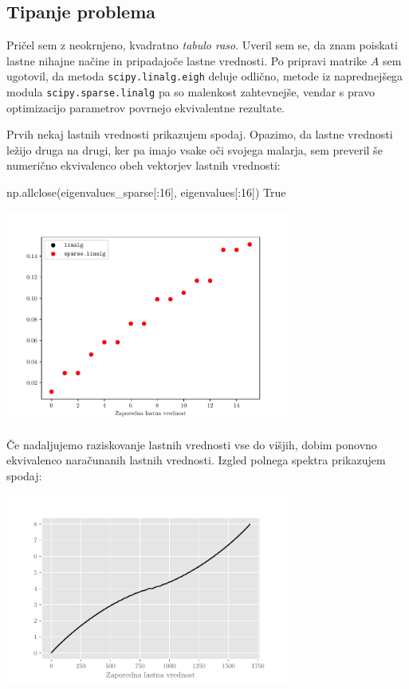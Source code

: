 
\subsection{Tipanje problema}
Pričel sem z neokrnjeno, kvadratno \emph{tabulo raso}. Uveril sem se, da znam poiskati lastne nihajne načine in pripadajoče lastne vrednosti. Po pripravi matrike $A$ sem ugotovil, da metoda \texttt{scipy.linalg.eigh} deluje odlično, metode iz naprednejšega modula \texttt{scipy.sparse.linalg} pa so malenkost zahtevnejše, vendar s pravo optimizacijo parametrov povrnejo ekvivalentne rezultate.

Prvih nekaj lastnih vrednosti prikazujem spodaj. Opazimo, da lastne vrednosti ležijo druga na drugi, ker pa imajo vsake oči svojega malarja, sem preveril še numerično ekvivalenco obeh vektorjev lastnih vrednosti:
\begin{python}
np.allclose(eigenvalues_sparse[:16], eigenvalues[:16])
True
\end{python}
\begin{center}
    \includegraphics[width=0.7\textwidth]{../old/1-0-spekter-zoom.pdf}
\end{center}
Če nadaljujemo raziskovanje lastnih vrednosti vse do višjih, dobim ponovno ekvivalenco naračunanih lastnih vrednosti. Izgled polnega spektra prikazujem spodaj:
\begin{center}
    \includegraphics[width=0.7\textwidth]{../old/1-0-spekter.pdf}
\end{center}
